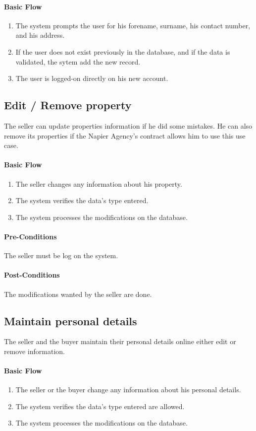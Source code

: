 \documentclass[a4paper,12pt]{article}
\begin{document}
\paragraph{Basic Flow}
\begin{enumerate}
\item The system prompts the user for his forename, surname, his contact number, and his address.
\item If the user does not exist previously in the database, and if the data is validated, the sytem add the new record.
\item The user is logged-on directly on his new account.
\end{enumerate}

\subsection{Edit / Remove property}
The seller can update properties information if he did some mistakes. He can also remove its properties if the Napier Agency's contract allows him to use this use case.
\paragraph{Basic Flow}
\begin{enumerate}
\item The seller changes any information about his property.
\item The system verifies the data's type entered.
\item The system processes the modifications on the database.
\end{enumerate}
\paragraph{Pre-Conditions}
The seller must be log on the system.
\paragraph{Post-Conditions}
The modifications wanted by the seller are done.

\subsection{Maintain personal details}
The seller and the buyer maintain their personal details online either edit or remove information.
\paragraph{Basic Flow}
\begin{enumerate}
\item The seller or the buyer change any information about his personal details.
\item The system verifies the data's type entered are allowed.
\item The system processes the modifications on the database.
\end{enumerate}
\end{document}
